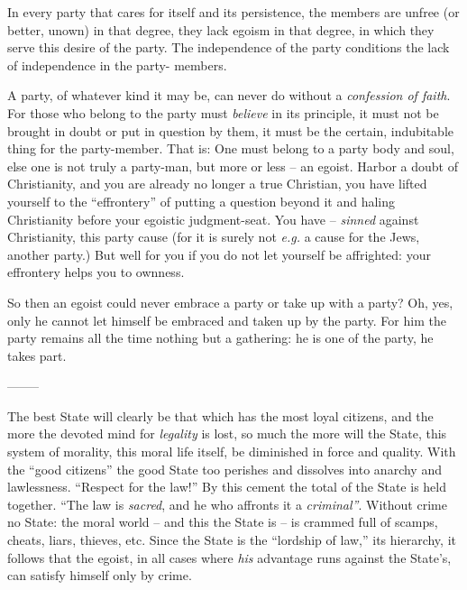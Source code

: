 \documentclass[12pt,a4paper]{book}
\begin{document}
In every party that cares for itself and its persistence, the members are 
unfree (or better, unown) in that degree, they lack egoism in that degree, in 
which they serve this desire of the party. The independence of the party 
conditions the lack of independence in the party- members.

A party, of whatever kind it may be, can never do without a \textit{confession 
of faith}. For those who belong to the party must \textit{believe} in its 
principle, it must not be brought in doubt or put in question by them, it must 
be the certain, indubitable thing for the party-member. That is: One must 
belong to a party body and soul, else one is not truly a party-man, but more 
or less -- an egoist. Harbor a doubt of Christianity, and you are already no 
longer a true Christian, you have lifted yourself to the ``effrontery'' of 
putting a question beyond it and haling Christianity before your egoistic 
judgment-seat. You have -- \textit{sinned} against Christianity, this party 
cause (for it is surely not \textit{e.g.} a cause for the Jews, another 
party.) But well for you if you do not let yourself be affrighted: your 
effrontery helps you to ownness.

So then an egoist could never embrace a party or take up with a party? Oh, 
yes, only he cannot let himself be embraced and taken up by the party. For him 
the party remains all the time nothing but a gathering: he is one of the 
party, he takes part.

\begin{center}
--------\end{center}


The best State will clearly be that which has the most loyal citizens, and the 
more the devoted mind for \textit{legality} is lost, so much the more will the 
State, this system of morality, this moral life itself, be diminished in force 
and quality. With the ``good citizens'' the good State too perishes and 
dissolves into anarchy and lawlessness. ``Respect for the law!'' By this 
cement the total of the State is held together. ``The law is \textit{sacred}, 
and he who affronts it a \textit{criminal''}. Without crime no State: the 
moral world -- and this the State is -- is crammed full of scamps, cheats, 
liars, thieves, etc. Since the State is the ``lordship of law,'' its 
hierarchy, it follows that the egoist, in all cases where \textit{his} 
advantage runs against the State's, can satisfy himself only by crime.
\end{document}
